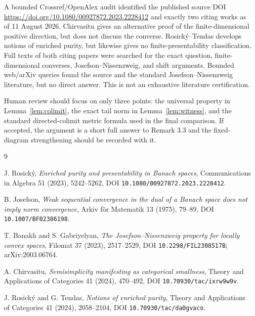 \documentclass[11pt]{article}
\begin{document}
A bounded Crossref/OpenAlex audit identified the published source DOI
\url{https://doi.org/10.1080/00927872.2023.2228412} and exactly two citing
works as of
11 August 2026.  Chirvasitu \cite{Chirvasitu} gives an alternative proof of
the finite-dimensional positive direction, but does not discuss the converse.
Rosick\'y--Tendas \cite{RosickyTendas} develops notions of enriched purity,
but likewise gives no finite-presentability classification.  Full texts of
both citing papers were searched for the exact question, finite-dimensional
converses, Josefson--Nissenzweig, and shift arguments.  Bounded web/arXiv
queries found the source and the standard Josefson--Nissenzweig literature,
but no direct answer.  This is not an exhaustive literature certification.

Human review should focus on only three points: the universal property in
Lemma~\ref{lem:colimit}, the exact tail norm in Lemma~\ref{lem:witness}, and
the standard directed-colimit metric formula used in the final comparison.
If accepted, the argument is a short full answer to Remark 3.3 and the
fixed-diagram strengthening should be recorded with it.

\begin{thebibliography}{9}

J. Rosick\'y,
\emph{Enriched purity and presentability in Banach spaces},
Communications in Algebra 51 (2023), 5242--5262,
DOI \texttt{10.1080/00927872.2023.2228412}.

B. Josefson,
\emph{Weak sequential convergence in the dual of a Banach space does not
imply norm convergence},
Arkiv f\"or Matematik 13 (1975), 79--89,
DOI \texttt{10.1007/BF02386198}.

T. Banakh and S. Gabriyelyan,
\emph{The Josefson--Nissenzweig property for locally convex spaces},
Filomat 37 (2023), 2517--2529,
DOI \texttt{10.2298/FIL2308517B}; arXiv:2003.06764.

A. Chirvasitu,
\emph{Semisimplicity manifesting as categorical smallness},
Theory and Applications of Categories 41 (2024), 470--492,
DOI \texttt{10.70930/tac/ixrw9w9v}.

J. Rosick\'y and G. Tendas,
\emph{Notions of enriched purity},
Theory and Applications of Categories 41 (2024), 2058--2104,
DOI \texttt{10.70930/tac/da0gvaco}.

\end{thebibliography}
\end{document}
